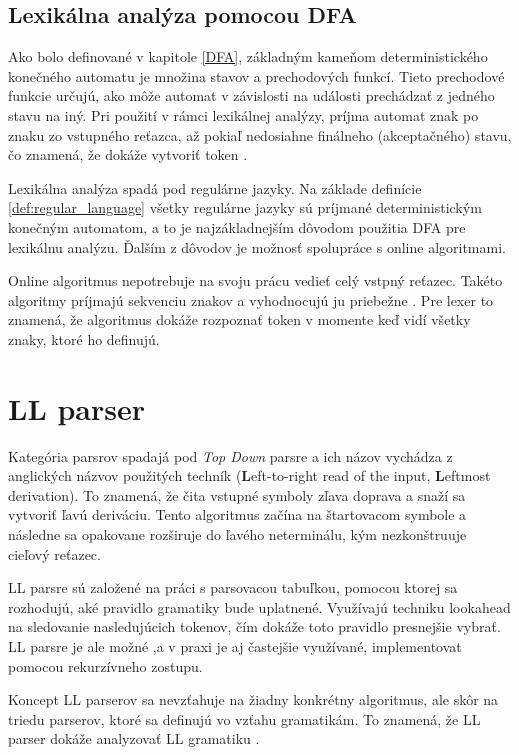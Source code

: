 \subsection{Lexikálna analýza pomocou DFA}
Ako bolo definované v kapitole \ref{DFA}, základným kameňom deterministického konečného automatu je množina stavov a prechodových funkcí. Tieto prechodové funkcie určujú, ako môže automat v závislosti na události prechádzať z jedného stavu na iný. Pri použití v rámci lexikálnej analýzy, príjma automat znak po znaku zo vstupného reťazca, až pokiaľ nedosiahne finálneho (akceptačného) stavu, čo znamená, že dokáže vytvoriť token \cite{roche1997finite}.

Lexikálna analýza spadá pod regulárne jazyky. Na základe definície \ref{def:regular_language} všetky regulárne jazyky sú príjmané deterministickým konečným automatom, a to je najzákladnejším dôvodom použitia DFA pre lexikálnu analýzu. Ďalším z dôvodov je možnosť spolupráce s online algoritmami.

Online algoritmus nepotrebuje na svoju prácu vedieť celý vstpný reťazec. Takéto algoritmy príjmajú sekvenciu znakov a vyhodnocujú ju priebežne \cite{karp1992line}. Pre lexer to znamená, že algoritmus dokáže rozpoznať token v momente keď vidí všetky znaky, ktoré ho definujú.

\section{LL parser}\label{LL}
Kategória  parsrov spadajá pod \textit{Top Down} parsre a ich názov vychádza z anglických názvov použitých techník (\textbf{L}eft-to-right read of the input, \textbf{L}eftmost derivation). To znamená, že čita vstupné symboly zľava doprava a snaží sa vytvoriť ľavú deriváciu. Tento algoritmus začína na štartovacom symbole a následne sa opakovane rozširuje do ľavého neterminálu, kým nezkonštruuje cieľový reťazec. 

LL parsre sú založené na práci s parsovacou tabuľkou, pomocou ktorej sa rozhodujú, aké pravidlo gramatiky bude uplatnené. Využívajú techniku lookahead na sledovanie nasledujúcich tokenov, čím dokáže toto pravidlo presnejšie vybrať. LL parsre je ale možné ,a v praxi je aj častejšie využívané, implementovat pomocou rekurzívneho zostupu.

Koncept LL parserov sa nevzťahuje na žiadny konkrétny algoritmus, ale skôr na triedu parserov, ktoré sa definujú vo vzťahu  gramatikám. To znamená, že LL parser dokáže analyzovať LL gramatiku \cite{haberman:hard_parsing}.

